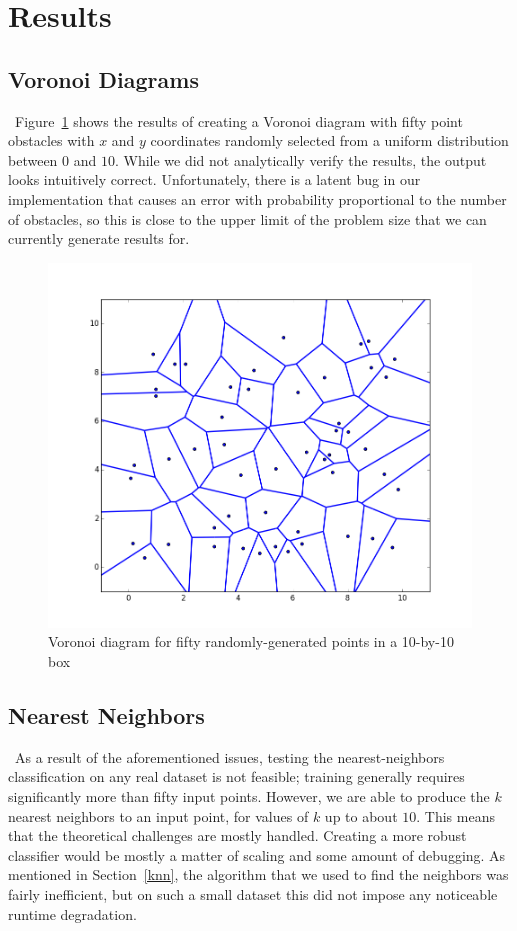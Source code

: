 \documentclass[conference]{IEEEtran}
\begin{document}
\section{Results}
\subsection{Voronoi Diagrams}
\noindent\ Figure~\ref{voronoi} shows the results of creating a Voronoi diagram with fifty
point obstacles with $x$ and $y$ coordinates randomly selected from a uniform
distribution between $0$ and $10$. While we did not analytically verify the
results, the output looks intuitively correct. Unfortunately, there is a latent
bug in our implementation that causes an error with probability proportional
to the number of obstacles, so this is close to the upper limit of the problem
size that we can currently generate results for.

\begin{figure}[tp]
    \includegraphics[width=\columnwidth]{50}
    \caption{Voronoi diagram for fifty randomly-generated points in a 10-by-10
    box}\label{voronoi}
\end{figure}

\subsection{Nearest Neighbors}
\noindent\ As a result of the aforementioned issues, testing the nearest-neighbors
classification on any real dataset is not feasible; training generally requires
significantly more than fifty input points. However, we are able to produce the
$k$ nearest neighbors to an input point, for values of $k$ up to about $10$.
This means that the theoretical challenges are mostly handled. Creating a more
robust classifier would be mostly a matter of scaling and some amount of
debugging. As mentioned in Section~\ref{knn}, the algorithm that we used
to find the neighbors was fairly inefficient, but on such a small dataset this
did not impose any noticeable runtime degradation.
\end{document}
